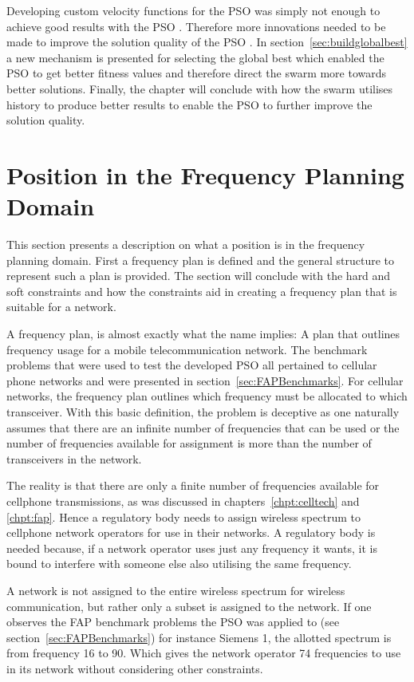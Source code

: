Developing custom velocity functions for the \gls{PSO} was simply not enough to achieve good results with the \gls{PSO} . Therefore more innovations needed to be made to improve the solution quality of the \gls{PSO} . In section~\ref{sec:buildglobalbest} a new mechanism is presented for selecting the global best which enabled the \gls{PSO} to get better fitness values and therefore direct the swarm more towards better solutions. Finally, the chapter will conclude with how the swarm utilises history to produce better results to enable the \gls{PSO} to further improve the solution quality.
\section{Position in the Frequency Planning Domain}
This section presents a description on what a position is in the frequency planning domain. First a frequency plan is defined and the general structure to represent such a plan is provided. The section will conclude with the hard and soft constraints and how the constraints aid in creating a frequency plan that is suitable for a network.

A frequency plan, is almost exactly what the name implies: A plan that outlines frequency usage for a mobile telecommunication network. The benchmark problems that were used to test the developed \gls{PSO} all pertained to cellular phone networks and were presented in section~\ref{sec:FAPBenchmarks}. For cellular networks, the frequency plan outlines which frequency must be allocated to which transceiver. With this basic definition, the problem is deceptive as one naturally assumes that there are an infinite number of frequencies that can be used or the number of frequencies available for assignment is more than the number of transceivers in the network. 

The reality is that there are only a finite number of frequencies available for cellphone transmissions, as was discussed in chapters~\ref{chpt:celltech} and \ref{chpt:fap}. Hence a regulatory body needs to assign wireless spectrum to cellphone network operators for use in their networks. A regulatory body is needed because, if a network operator uses just any frequency it wants, it is bound to interfere with someone else also utilising the same frequency.

A network is not assigned to the entire wireless spectrum for wireless communication, but rather only a subset is assigned to the network. If one observes the \gls{FAP} benchmark problems the \gls{PSO} was applied to (see section~\ref{sec:FAPBenchmarks}) for instance Siemens 1, the allotted spectrum is from frequency 16 to 90. Which gives the network operator 74 frequencies to use in its network without considering other constraints. 

